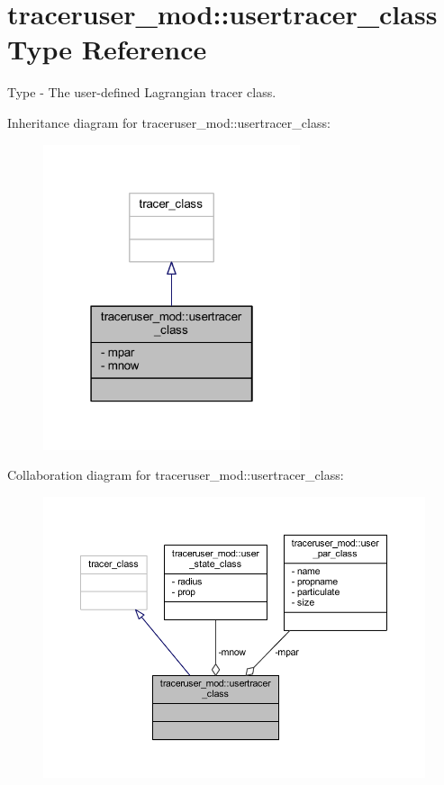\hypertarget{structtraceruser__mod_1_1usertracer__class}{}\section{traceruser\+\_\+mod\+:\+:usertracer\+\_\+class Type Reference}
\label{structtraceruser__mod_1_1usertracer__class}


Type -\/ The user-\/defined Lagrangian tracer class.  




Inheritance diagram for traceruser\+\_\+mod\+:\+:usertracer\+\_\+class\+:\nopagebreak
\begin{figure}[H]
\begin{center}
\leavevmode
\includegraphics[width=214pt]{structtraceruser__mod_1_1usertracer__class__inherit__graph}
\end{center}
\end{figure}


Collaboration diagram for traceruser\+\_\+mod\+:\+:usertracer\+\_\+class\+:\nopagebreak
\begin{figure}[H]
\begin{center}
\leavevmode
\includegraphics[width=350pt]{structtraceruser__mod_1_1usertracer__class__coll__graph}
\end{center}
\end{figure}
